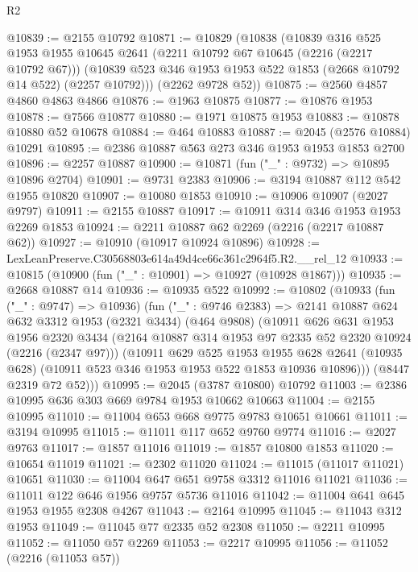 \begin{lexlean}{R2}
\begin{coremodule}
@10839 := @2155 @10792
@10871 := @10829
    (@10838
      (@10839
        @316
        @525
        @1953
        @1955
        @10645
        @2641
        (@2211 @10792 @67 @10645 (@2216 (@2217 @10792 @67)))
        (@10839 @523 @346 @1953 @1953 @522 @1853 (@2668 @10792 @14 @522) (@2257 @10792)))
      (@2262 @9728 @52))
@10875 := @2560 @4857 @4860 @4863 @4866
@10876 := @1963 @10875
@10877 := @10876 @1953
@10878 := @7566 @10877
@10880 := @1971 @10875 @1953
@10883 := @10878 @10880 @52 @10678
@10884 := @464 @10883
@10887 := @2045 (@2576 @10884) @10291
@10895 := @2386 @10887 @563 @273 @346 @1953 @1953 @1853 @2700
@10896 := @2257 @10887
@10900 := @10871 (fun ("_" : @9732) => @10895 @10896 @2704)
@10901 := @9731 @2383
@10906 := @3194 @10887 @112 @542 @1955 @10820
@10907 := @10080 @1853
@10910 := @10906 @10907 (@2027 @9797)
@10911 := @2155 @10887
@10917 := @10911 @314 @346 @1953 @1953 @2269 @1853
@10924 := @2211 @10887 @62 @2269 (@2216 (@2217 @10887 @62))
@10927 := @10910 (@10917 @10924 @10896)
@10928 := LexLeanPreserve.C30568803e614a49d4ce66c361c2964f5.R2.__rel_12
@10933 := @10815 (@10900 (fun ("_" : @10901) => @10927 (@10928 @1867)))
@10935 := @2668 @10887 @14
@10936 := @10935 @522
@10992 := @10802
    (@10933
      (fun ("_" : @9747) => @10936)
      (fun ("_" : @9746 @2383) =>
      @2141
        @10887
        @624
        @632
        @3312
        @1953
        (@2321 @3434)
        (@464 @9808)
        (@10911
          @626
          @631
          @1953
          @1956
          @2320
          @3434
          (@2164 @10887 @314 @1953 @97 @2335 @52 @2320 @10924 (@2216 (@2347 @97)))
          (@10911
            @629
            @525
            @1953
            @1955
            @628
            @2641
            (@10935 @628)
            (@10911 @523 @346 @1953 @1953 @522 @1853 @10936 @10896)))
        (@8447 @2319 @72 @52)))
@10995 := @2045 (@3787 @10800) @10792
@11003 := @2386 @10995 @636 @303 @669 @9784 @1953 @10662 @10663
@11004 := @2155 @10995
@11010 := @11004 @653 @668 @9775 @9783 @10651 @10661
@11011 := @3194 @10995
@11015 := @11011 @117 @652 @9760 @9774
@11016 := @2027 @9763
@11017 := @1857 @11016
@11019 := @1857 @10800 @1853
@11020 := @10654 @11019
@11021 := @2302 @11020
@11024 := @11015 (@11017 @11021) @10651
@11030 := @11004 @647 @651 @9758 @3312 @11016 @11021
@11036 := @11011 @122 @646 @1956 @9757 @5736 @11016
@11042 := @11004 @641 @645 @1953 @1955 @2308 @4267
@11043 := @2164 @10995
@11045 := @11043 @312 @1953
@11049 := @11045 @77 @2335 @52 @2308
@11050 := @2211 @10995
@11052 := @11050 @57 @2269
@11053 := @2217 @10995
@11056 := @11052 (@2216 (@11053 @57))

\end{coremodule}
\end{lexlean}
